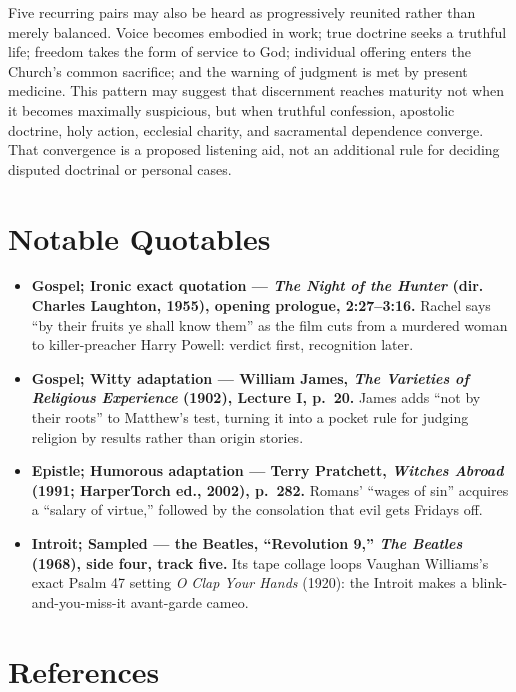 \begin{deepstudy}
Five recurring pairs may also be heard as progressively reunited rather than merely balanced. Voice becomes embodied in work; true doctrine seeks a truthful life; freedom takes the form of service to God; individual offering enters the Church's common sacrifice; and the warning of judgment is met by present medicine. This pattern may suggest that discernment reaches maturity not when it becomes maximally suspicious, but when truthful confession, apostolic doctrine, holy action, ecclesial charity, and sacramental dependence converge. That convergence is a proposed listening aid, not an additional rule for deciding disputed doctrinal or personal cases.

\sectionguard
\section*{Notable Quotables}

{\small
\begin{itemize}[leftmargin=1.25em,itemsep=0.4em,topsep=0.15em,parsep=0pt]
\item \textbf{Gospel; Ironic exact quotation --- \emph{The Night of the Hunter} (dir. Charles Laughton, 1955), opening prologue, 2:27--3:16.} Rachel says ``by their fruits ye shall know them'' as the film cuts from a murdered woman to killer-preacher Harry Powell: verdict first, recognition later.

\item \textbf{Gospel; Witty adaptation --- William James, \emph{The Varieties of Religious Experience} (1902), Lecture I, p.~20.} James adds ``not by their roots'' to Matthew's test, turning it into a pocket rule for judging religion by results rather than origin stories.

\item \textbf{Epistle; Humorous adaptation --- Terry Pratchett, \emph{Witches Abroad} (1991; HarperTorch ed., 2002), p.~282.} Romans' ``wages of sin'' acquires a ``salary of virtue,'' followed by the consolation that evil gets Fridays off.

\item \textbf{Introit; Sampled --- the Beatles, ``Revolution 9,'' \emph{The Beatles} (1968), side four, track five.} Its tape collage loops Vaughan Williams's exact Psalm 47 setting \emph{O Clap Your Hands} (1920): the Introit makes a blink-and-you-miss-it avant-garde cameo.
\end{itemize}
}

\section*{References}


\end{deepstudy}
